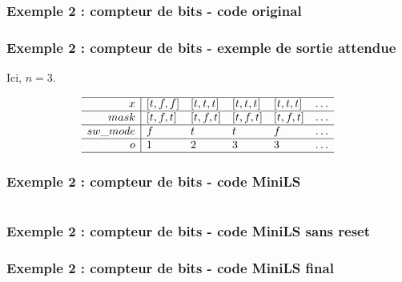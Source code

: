 \documentclass{beamer}
\begin{document}
\begin{frame}
  \frametitle{Exemple 2 : compteur de bits - code original}

  \footnotesize

  
\end{frame}

\begin{frame}
  \frametitle{Exemple 2 : compteur de bits - exemple de sortie attendue}

  Ici, $n = 3$.

  \[
  \begin{array}{r|llllllllllllllllllllllllllll}
    \hline
    x & [t,f,f] & [t,t,t] & [t,t,t] & [t,t,t] & \dots \\
    \hline
    mask & [t,f,t] & [t,f,t] & [t,f,t] & [t,f,t] & \dots \\
    \hline
    sw\_mode & f & t & t & f & \dots \\
    \hline
    o & 1 & 2 & 3 & 3 & \dots \\
    \hline
  \end{array}
  \]
\end{frame}

\begin{frame}
  \frametitle{Exemple 2 : compteur de bits - code MiniLS}

  \tiny

  \begin{columns}[t]
    \hspace{1cm}
    \begin{column}{6cm}
      
    \end{column}
    \begin{column}{6cm}
      
    \end{column}
  \end{columns}
\end{frame}

\begin{frame}
  \frametitle{Exemple 2 : compteur de bits - code MiniLS sans reset}
  \tiny
  
\end{frame}

\begin{frame}
  \frametitle{Exemple 2 : compteur de bits - code MiniLS final}
  \tiny
  
\end{frame}
\end{document}
